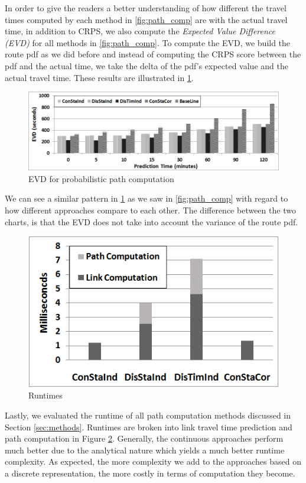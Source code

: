 In order to give the readers a better understanding of how different the travel times computed by each method in \cref{fig:path_comp} are with the actual travel time, in addition to CRPS, we also compute the \textit{Expected Value Difference (EVD)} for all methods in \cref{fig:path_comp}. To compute the EVD, we build the route pdf as we did before and instead of computing the CRPS score between the pdf and the actual time, we take the delta of the pdf's expected value and the actual travel time. These results are illustrated in \cref{fig:path_comp_ev}.

\begin{figure}[h]
	\centering
	\includegraphics[width = 0.9\columnwidth]{figures/Approaches_All_EVD.png}
	\caption{EVD for probabilistic path computation}\label{fig:path_comp_ev}
\end{figure}

We can see a similar pattern in \cref{fig:path_comp_ev} as we saw in \cref{fig:path_comp} with regard to how different approaches compare to each other. The difference between the two charts, is that the EVD does not take into account the variance of the route pdf.

\begin{figure}
    \centering
    \includegraphics[width = 0.6\columnwidth]{figures/Runtime.png}
    \caption{Runtimes}\label{fig:runtimes}
\end{figure}

Lastly, we evaluated the runtime of all path computation methods discussed in Section \ref{sec:methods}. Runtimes are broken into link travel time prediction and path computation in Figure \ref{fig:runtimes}. Generally, the continuous approaches perform much better due to the analytical nature which yields a much better runtime complexity. As expected, the more complexity we add to the approaches based on a discrete representation, the more costly in terms of computation they become.